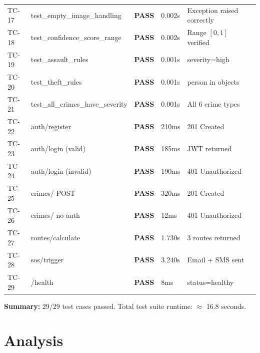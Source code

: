 \documentclass[12pt,a4paper]{report}
\begin{document}
\begin{longtable}{@{}p{0.8cm}p{5cm}p{1.8cm}p{1.8cm}p{4cm}@{}}
TC-17 & test\_empty\_image\_handling & \textcolor{codegreen}{\textbf{PASS}} & 0.002s & Exception raised correctly \\
TC-18 & test\_confidence\_score\_range & \textcolor{codegreen}{\textbf{PASS}} & 0.002s & Range $[0,1]$ verified \\
TC-19 & test\_assault\_rules & \textcolor{codegreen}{\textbf{PASS}} & 0.001s & severity=high \\
TC-20 & test\_theft\_rules & \textcolor{codegreen}{\textbf{PASS}} & 0.001s & person in objects \\
TC-21 & test\_all\_crimes\_have\_severity & \textcolor{codegreen}{\textbf{PASS}} & 0.001s & All 6 crime types \\
TC-22 & auth/register & \textcolor{codegreen}{\textbf{PASS}} & 210ms & 201 Created \\
TC-23 & auth/login (valid) & \textcolor{codegreen}{\textbf{PASS}} & 185ms & JWT returned \\
TC-24 & auth/login (invalid) & \textcolor{codegreen}{\textbf{PASS}} & 190ms & 401 Unauthorized \\
TC-25 & crimes/ POST & \textcolor{codegreen}{\textbf{PASS}} & 320ms & 201 Created \\
TC-26 & crimes/ no auth & \textcolor{codegreen}{\textbf{PASS}} & 12ms & 401 Unauthorized \\
TC-27 & routes/calculate & \textcolor{codegreen}{\textbf{PASS}} & 1.730s & 3 routes returned \\
TC-28 & sos/trigger & \textcolor{codegreen}{\textbf{PASS}} & 3.240s & Email + SMS sent \\
TC-29 & /health & \textcolor{codegreen}{\textbf{PASS}} & 8ms & status=healthy \\
\bottomrule
\end{longtable}
\normalsize

\textbf{Summary:} 29/29 test cases passed. Total test suite runtime: $\approx$ 16.8 seconds.

\section{Analysis}
\end{document}
